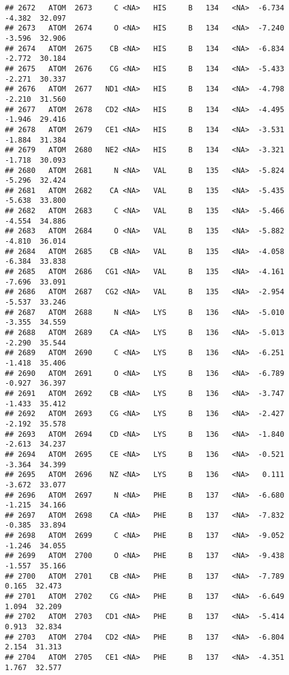 \documentclass[
]{article}
\begin{document}
\begin{verbatim}
## 2672   ATOM  2673     C <NA>   HIS     B   134   <NA>  -6.734  -4.382  32.097
## 2673   ATOM  2674     O <NA>   HIS     B   134   <NA>  -7.240  -3.596  32.906
## 2674   ATOM  2675    CB <NA>   HIS     B   134   <NA>  -6.834  -2.772  30.184
## 2675   ATOM  2676    CG <NA>   HIS     B   134   <NA>  -5.433  -2.271  30.337
## 2676   ATOM  2677   ND1 <NA>   HIS     B   134   <NA>  -4.798  -2.210  31.560
## 2677   ATOM  2678   CD2 <NA>   HIS     B   134   <NA>  -4.495  -1.946  29.416
## 2678   ATOM  2679   CE1 <NA>   HIS     B   134   <NA>  -3.531  -1.884  31.384
## 2679   ATOM  2680   NE2 <NA>   HIS     B   134   <NA>  -3.321  -1.718  30.093
## 2680   ATOM  2681     N <NA>   VAL     B   135   <NA>  -5.824  -5.296  32.424
## 2681   ATOM  2682    CA <NA>   VAL     B   135   <NA>  -5.435  -5.638  33.800
## 2682   ATOM  2683     C <NA>   VAL     B   135   <NA>  -5.466  -4.554  34.886
## 2683   ATOM  2684     O <NA>   VAL     B   135   <NA>  -5.882  -4.810  36.014
## 2684   ATOM  2685    CB <NA>   VAL     B   135   <NA>  -4.058  -6.384  33.838
## 2685   ATOM  2686   CG1 <NA>   VAL     B   135   <NA>  -4.161  -7.696  33.091
## 2686   ATOM  2687   CG2 <NA>   VAL     B   135   <NA>  -2.954  -5.537  33.246
## 2687   ATOM  2688     N <NA>   LYS     B   136   <NA>  -5.010  -3.355  34.559
## 2688   ATOM  2689    CA <NA>   LYS     B   136   <NA>  -5.013  -2.290  35.544
## 2689   ATOM  2690     C <NA>   LYS     B   136   <NA>  -6.251  -1.418  35.406
## 2690   ATOM  2691     O <NA>   LYS     B   136   <NA>  -6.789  -0.927  36.397
## 2691   ATOM  2692    CB <NA>   LYS     B   136   <NA>  -3.747  -1.433  35.412
## 2692   ATOM  2693    CG <NA>   LYS     B   136   <NA>  -2.427  -2.192  35.578
## 2693   ATOM  2694    CD <NA>   LYS     B   136   <NA>  -1.840  -2.613  34.237
## 2694   ATOM  2695    CE <NA>   LYS     B   136   <NA>  -0.521  -3.364  34.399
## 2695   ATOM  2696    NZ <NA>   LYS     B   136   <NA>   0.111  -3.672  33.077
## 2696   ATOM  2697     N <NA>   PHE     B   137   <NA>  -6.680  -1.215  34.166
## 2697   ATOM  2698    CA <NA>   PHE     B   137   <NA>  -7.832  -0.385  33.894
## 2698   ATOM  2699     C <NA>   PHE     B   137   <NA>  -9.052  -1.246  34.055
## 2699   ATOM  2700     O <NA>   PHE     B   137   <NA>  -9.438  -1.557  35.166
## 2700   ATOM  2701    CB <NA>   PHE     B   137   <NA>  -7.789   0.165  32.473
## 2701   ATOM  2702    CG <NA>   PHE     B   137   <NA>  -6.649   1.094  32.209
## 2702   ATOM  2703   CD1 <NA>   PHE     B   137   <NA>  -5.414   0.913  32.834
## 2703   ATOM  2704   CD2 <NA>   PHE     B   137   <NA>  -6.804   2.154  31.313
## 2704   ATOM  2705   CE1 <NA>   PHE     B   137   <NA>  -4.351   1.767  32.577

\end{verbatim}
\end{document}
